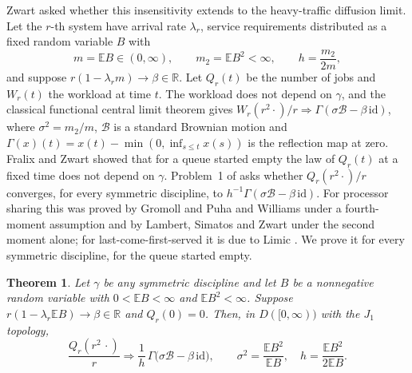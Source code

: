 \documentclass[11pt]{amsart}
\newtheorem{theorem}{Theorem}[section]
\theoremstyle{remark}
\numberwithin{equation}{section}
\newcommand{\E}{\mathbb E}
\newcommand{\1}{\mathbf 1}
\newcommand{\R}{\mathbb R}
\begin{document}
Zwart \cite{Zwa} asked whether this insensitivity extends to the heavy-traffic diffusion limit. Let the $r$-th system have arrival rate $\lambda_r$, service requirements distributed as a fixed random variable $B$ with
\[
m=\E B\in(0,\infty),\qquad m_2=\E B^2<\infty,\qquad h=\frac{m_2}{2m},
\]
and suppose $r(1-\lambda_rm)\to\beta\in\R$. Let $Q_r(t)$ be the number of jobs and $W_r(t)$ the workload at time $t$. The workload does not depend on $\gamma$, and the classical functional central limit theorem gives $W_r(r^2\cdot)/r\Rightarrow\Gamma(\sigma\mathcal B-\beta\,\mathrm{id})$, where $\sigma^2=m_2/m$, $\mathcal B$ is a standard Brownian motion and $\Gamma(x)(t)=x(t)-\min(0,\inf_{s\le t}x(s))$ is the reflection map at zero. Fralix and Zwart \cite{FZ} showed that for a queue started empty the law of $Q_r(t)$ at a fixed time does not depend on $\gamma$. Problem~1 of \cite{Zwa} asks whether $Q_r(r^2\cdot)/r$ converges, for every symmetric discipline, to $h^{-1}\Gamma(\sigma\mathcal B-\beta\,\mathrm{id})$. For processor sharing this was proved by Gromoll \cite{Gro} and Puha and Williams \cite{PW} under a fourth-moment assumption and by Lambert, Simatos and Zwart \cite{LSZ} under the second moment alone; for last-come-first-served it is due to Limic \cite{Lim}. We prove it for every symmetric discipline, for the queue started empty.

\begin{theorem}\label{thm:main}
Let $\gamma$ be any symmetric discipline and let $B$ be a nonnegative random variable with $0<\E B<\infty$ and $\E B^2<\infty$. Suppose $r(1-\lambda_r\E B)\to\beta\in\R$ and $Q_r(0)=0$. Then, in $D([0,\infty))$ with the $J_1$ topology,
\[
\frac{Q_r(r^2\,\cdot)}r\Rightarrow\frac1h\,\Gamma\bigl(\sigma\mathcal B-\beta\,\mathrm{id}\bigr),\qquad \sigma^2=\frac{\E B^2}{\E B},\quad h=\frac{\E B^2}{2\E B}.
\]
\end{theorem}
\end{document}
